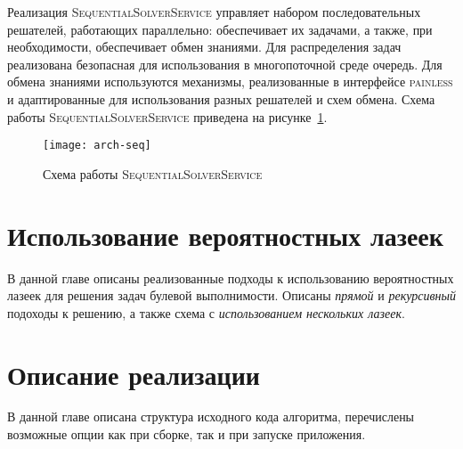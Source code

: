 Реализация \textsc{SequentialSolverService} управляет набором последовательных решателей, работающих
параллельно: обеспечивает их задачами, а также, при необходимости, обеспечивает обмен знаниями.
Для распределения задач реализована безопасная для использования в многопоточной среде очередь.
Для обмена знаниями используются механизмы, реализованные в интерфейсе \textsc{painless} и адаптированные
для использования разных решателей и схем обмена. Схема работы \textsc{SequentialSolverService}
приведена на рисунке~\ref{arch:solver:seq-img}.

\begin{figure}[H]
    \caption{Схема работы \textsc{SequentialSolverService}}
    \centering
    \texttt{[image: arch-seq]}
    \label{arch:solver:seq-img}
\end{figure}

\section{Использование вероятностных лазеек}\label{arch:solve}

В данной главе описаны реализованные подходы к использованию вероятностных лазеек для решения
задач булевой выполнимости. Описаны \textit{прямой} и \textit{рекурсивный} подоходы к решению,
а также схема с \textit{использованием нескольких лазеек}.

\section{Описание реализации}\label{arch:impl}

В данной главе описана структура исходного кода алгоритма, перечислены возможные опции как при
сборке, так и при запуске приложения.

\chapterconclusion
